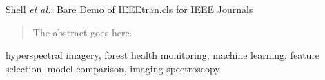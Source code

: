 \documentclass[letterpaper, peerreview, draftcls]{IEEEtran}
\begin{document}
%
{Shell \MakeLowercase{\textit{et al.}}: Bare Demo of IEEEtran.cls for IEEE Journals}
%

\maketitle

\begin{abstract}
	The abstract goes here.
\end{abstract}

\begin{IEEEkeywords}
	hyperspectral imagery, forest health monitoring, machine learning, feature selection, model comparison, imaging spectroscopy
\end{IEEEkeywords}

\ifCLASSOPTIONpeerreview{}
\fi

\IEEEpeerreviewmaketitle{}
\end{document}
